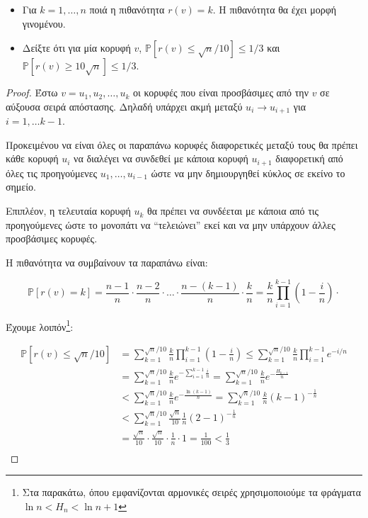 \documentclass[a4paper, oneside, 11pt]{article}
\theoremstyle{definition}
\newcommand{\pr}{\mathbb{P}}
\begin{document}
\begin{enumerate}
   \begin{itemize}
      \item Για $k = 1, \ldots, n$ ποιά η πιθανότητα $r(v) = k$. Η πιθανότητα θα
            έχει μορφή γινομένου.
      \item Δείξτε ότι για μία κορυφή $v$, $\pr [ r(v) \leq \sqrt{n} / 10 ]
            \leq 1/3$ και $\pr [ r(v) \geq 10\sqrt{n} ] \leq 1/3$.
   \end{itemize}

   \begin{proof}
      Έστω $v = u_1, u_2, \ldots, u_k$ οι κορυφές που είναι προσβάσιμες από την
      $v$ σε αύξουσα σειρά απόστασης. Δηλαδή υπάρχει ακμή μεταξύ $u_i
      \rightarrow u_{i+1}$ για $i = 1, \ldots k-1$.

      Προκειμένου να είναι όλες οι παραπάνω κορυφές διαφορετικές μεταξύ τους θα
      πρέπει κάθε κορυφή $u_i$ να διαλέγει να συνδεθεί με κάποια κορυφή
      $u_{i+1}$ διαφορετική από όλες τις προηγούμενες $u_1, \ldots, u_{i-1}$
      ώστε να μην δημιουργηθεί κύκλος σε εκείνο το σημείο.

      Επιπλέον, η τελευταία κορυφή $u_k$ θα πρέπει να συνδέεται με κάποια από
      τις προηγούμενες ώστε το μονοπάτι να ``τελειώνει'' εκεί και να μην
      υπάρχουν άλλες προσβάσιμες κορυφές.

      Η πιθανότητα να συμβαίνουν τα παραπάνω είναι:

      \[ \pr[r(v) = k] = \frac{n-1}{n} \cdot \frac{n-2}{n} \cdot \ldots \cdot
         \frac{n-(k-1)}{n} \cdot \frac{k}{n} = \frac{k}{n} \prod_{i=1}^{k-1}
         \left(1 - \frac{i}{n} \right) \cdot \]

      Έχουμε λοιπόν\footnote{Στα παρακάτω, όπου εμφανίζονται αρμονικές σειρές
      χρησιμοποιούμε τα φράγματα $\ln n < H_n < \ln n + 1$}:

      \begin{align*}
         \pr[r(v) \leq \sqrt{n}/10]
            &= \sum_{k=1}^{\sqrt{n}/10} \frac{k}{n} \prod_{i=1}^{k-1} \left(1 -
               \frac{i}{n} \right)
            \leq \sum_{k=1}^{\sqrt{n}/10} \frac{k}{n} \prod_{i=1}^{k-1}
               e^{-i/n}\\
            &= \sum_{k=1}^{\sqrt{n}/10} \frac{k}{n} e^{- \sum_{i=1}^{k-1}
               \frac{i}{n} }
            = \sum_{k=1}^{\sqrt{n}/10} \frac{k}{n} e^{- \frac{H_{k-1}}{n} }\\
            &< \sum_{k=1}^{\sqrt{n}/10} \frac{k}{n} e^{- \frac{\ln(k-1)}{n} }
            = \sum_{k=1}^{\sqrt{n}/10} \frac{k}{n} (k-1)^{-\frac{1}{n}}\\
            &< \sum_{k=1}^{\sqrt{n}/10} \frac{\sqrt{n}}{10} \frac{1}{n}
               (2-1)^{-\frac{1}{n}}\\
            &= \frac{\sqrt{n}}{10} \cdot \frac{\sqrt{n}}{10} \cdot \frac{1}{n}
               \cdot 1 = \frac{1}{100} < \frac{1}{3}\\
      \end{align*}


\end{proof}
\end{enumerate}
\end{document}
